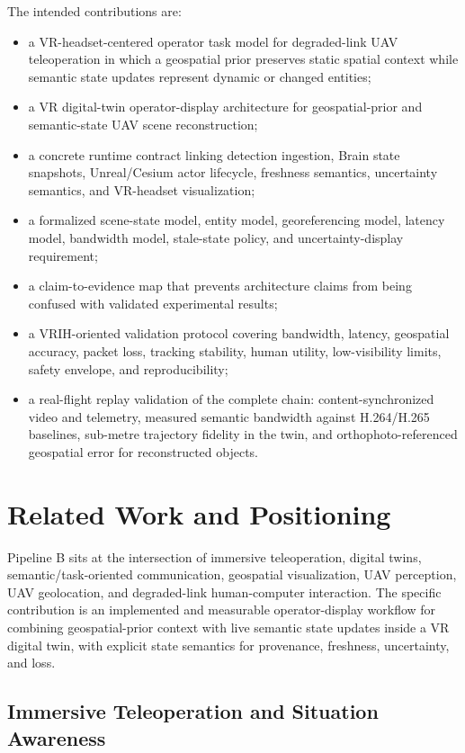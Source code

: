 \documentclass[fleqn]{VRIH2025}
\begin{document}
The intended contributions are:

\begin{itemize}
    \item a VR-headset-centered operator task model for degraded-link UAV teleoperation in which a geospatial prior preserves static spatial context while semantic state updates represent dynamic or changed entities;
    \item a VR digital-twin operator-display architecture for geospatial-prior and semantic-state UAV scene reconstruction;
    \item a concrete runtime contract linking detection ingestion, Brain state snapshots, Unreal/Cesium actor lifecycle, freshness semantics, uncertainty semantics, and VR-headset visualization;
    \item a formalized scene-state model, entity model, georeferencing model, latency model, bandwidth model, stale-state policy, and uncertainty-display requirement;
    \item a claim-to-evidence map that prevents architecture claims from being confused with validated experimental results;
    \item a VRIH-oriented validation protocol covering bandwidth, latency, geospatial accuracy, packet loss, tracking stability, human utility, low-visibility limits, safety envelope, and reproducibility;
    \item a real-flight replay validation of the complete chain: content-synchronized video and telemetry, measured semantic bandwidth against H.264/H.265 baselines, sub-metre trajectory fidelity in the twin, and orthophoto-referenced geospatial error for reconstructed objects.
\end{itemize}

\section{Related Work and Positioning}

Pipeline B sits at the intersection of immersive teleoperation, digital twins, semantic/task-oriented communication, geospatial visualization, UAV perception, UAV geolocation, and degraded-link human-computer interaction. The specific contribution is an implemented and measurable operator-display workflow for combining geospatial-prior context with live semantic state updates inside a VR digital twin, with explicit state semantics for provenance, freshness, uncertainty, and loss.

\subsection{Immersive Teleoperation and Situation Awareness}
\end{document}
